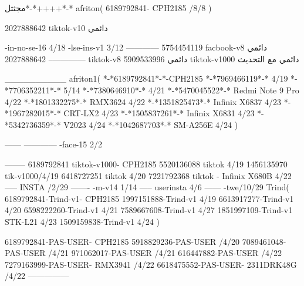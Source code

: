 مجثثل*-*++++*-*
afriton(
6189792841- CPH2185  /8/8
)

2027888642 tiktok-v10
دائمي

-in-no-se-16 4/18
-lse-ins-v1 3/12
------------
5754454119 facbook-v8
دائمي
--------------
2027888642 tiktok-v8
دائمي
5909533996 tiktok-v1000
دائمي مع التحديث

__________
afriton1(
*-*6189792841*-*-CPH2185
*-*7969466119*-* 4/19
*-*7706352211*-* 5/14
*-*7380646910*-* 4/21
*-*5470045522*-* Redmi Note 9 Pro 4/22
*-*1801332275*-* RMX3624 4/22
*-*1351825473*-* Infinix X6837 4/23
*-*1967282015*-* CRT-LX2 4/23
*-*1505837261*-* Infinix X6831 4/23
*-*5342736359*-* V2023 4/24
*-*1042687703*-* SM-A256E 4/24
)


------
------------
-face-15 2/2

--------
6189792841 tiktok-v1000- CPH2185 
5520136088 tiktok 4/19
1456135970 tik-v1000/4/19
6418727251 tiktok 4/20
7221792368 tiktok - Infinix X680B  4/22 
-----
 INSTA /2/29
-------
-m-v14 1/14
-----
userinsta 4/6
------
-twe/10/29
Trind(
6189792841-Trind-v1- CPH2185 
1997151888-Trind-v1  4/19
6613917277-Trind-v1  4/20
6598222260-Trind-v1  4/21
7589667608-Trind-v1  4/27
1851997109-Trind-v1 STK-L21 4/23
1509159838-Trind-v1  4/24
)

6189792841-PAS-USER- CPH2185 
5918829236-PAS-USER /4/20
7089461048-PAS-USER /4/21
971062017-PAS-USER /4/21
616447882-PAS-USER /4/22
7279163999-PAS-USER- RMX3941 /4/22
6618475552-PAS-USER- 2311DRK48G /4/22
    ---------------
